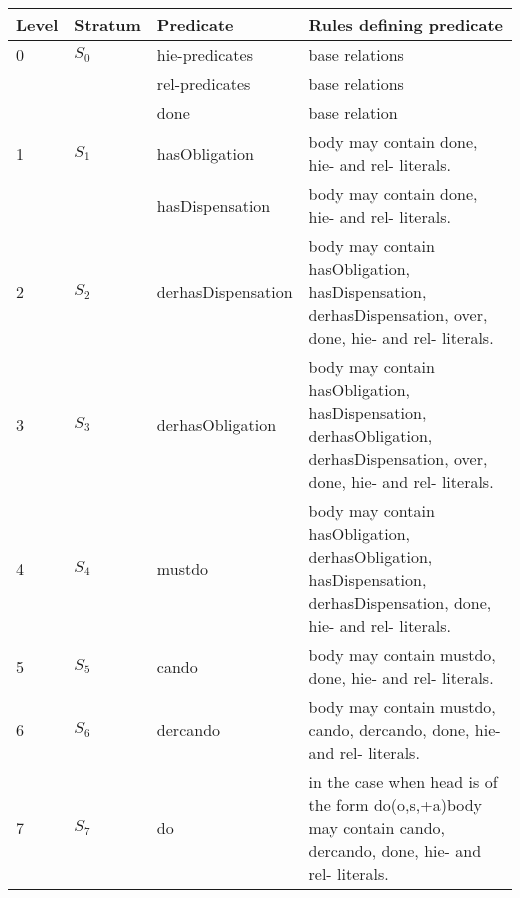 \documentclass[12pt,journal,letterpaper,onecolumn]{IEEEtran}
\begin{document}
\begin{table}[h]
\begin{center}
\begin{minipage}[t]{6in}
\footnotesize
\begin{tabular}{|l|l|l|p{3.2in}|}
\hline

Level & Stratum & Predicate & Rules defining predicate \\

\hline

0 & $S_0$ & hie-predicates & base relations \\
  &     & rel-predicates & base relations \\
  &     & done & base relation \\

\hline

1 & $S_1$ & hasObligation & body may contain done, hie- and rel- literals. \\
  &        & hasDispensation & body may contain done, hie- and rel- literals. \\







\hline

2 & $S_2$ & derhasDispensation & body may contain hasObligation,
hasDispensation, derhasDispensation, over, done,
hie- and rel- literals.\\
\hline

3 & $S_3$ & derhasObligation & body may contain hasObligation,
hasDispensation,
derhasObligation, derhasDispensation, over, done, hie- and rel- literals.\\


\hline

4 & $S_4$ & mustdo & body may contain hasObligation,
derhasObligation, hasDispensation, derhasDispensation, done,
hie- and rel- literals.\\

\hline

5 & $S_5$ & cando & body may contain mustdo, done,
hie- and rel- literals.\\

\hline

6 & $S_6$ & dercando & body may contain mustdo, cando, dercando,
 done, hie- and rel- literals.\\

\hline

7 & $S_7$ & do & in the case when head is of the form do(o,s,+a)body
may contain cando, dercando, done,
hie- and rel- literals.\\
\hline


\end{tabular}
\end{minipage}
\end{center}
\end{table}
\end{document}
